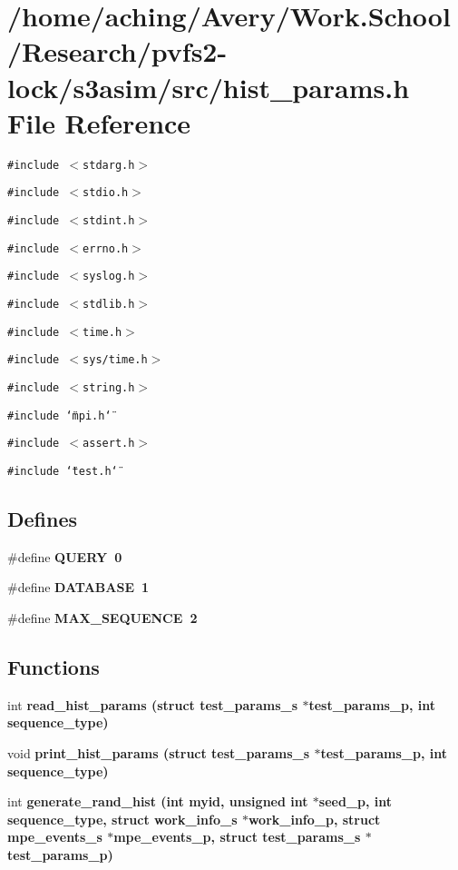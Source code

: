\section{/home/aching/Avery/Work.School/Research/pvfs2-lock/s3asim/src/hist\_\-params.h File Reference}
\label{hist__params_8h}
{\tt \#include $<$stdarg.h$>$}\par
{\tt \#include $<$stdio.h$>$}\par
{\tt \#include $<$stdint.h$>$}\par
{\tt \#include $<$errno.h$>$}\par
{\tt \#include $<$syslog.h$>$}\par
{\tt \#include $<$stdlib.h$>$}\par
{\tt \#include $<$time.h$>$}\par
{\tt \#include $<$sys/time.h$>$}\par
{\tt \#include $<$string.h$>$}\par
{\tt \#include \char`\"{}mpi.h\char`\"{}}\par
{\tt \#include $<$assert.h$>$}\par
{\tt \#include \char`\"{}test.h\char`\"{}}\par
\subsection*{Defines}
\begin{CompactItemize}
\item 
\#define \bf{QUERY}~0
\item 
\#define \bf{DATABASE}~1
\item 
\#define \bf{MAX\_\-SEQUENCE}~2
\end{CompactItemize}
\subsection*{Functions}
\begin{CompactItemize}
\item 
int \bf{read\_\-hist\_\-params} (struct \bf{test\_\-params\_\-s} $\ast$test\_\-params\_\-p, int sequence\_\-type)
\item 
void \bf{print\_\-hist\_\-params} (struct \bf{test\_\-params\_\-s} $\ast$test\_\-params\_\-p, int sequence\_\-type)
\item 
int \bf{generate\_\-rand\_\-hist} (int myid, unsigned int $\ast$seed\_\-p, int sequence\_\-type, struct \bf{work\_\-info\_\-s} $\ast$work\_\-info\_\-p, struct \bf{mpe\_\-events\_\-s} $\ast$mpe\_\-events\_\-p, struct \bf{test\_\-params\_\-s} $\ast$test\_\-params\_\-p)
\end{CompactItemize}


